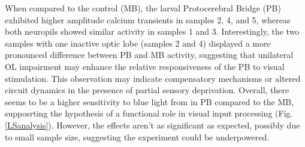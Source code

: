 When compared to the control (MB), the larval Protocerebral Bridge (PB) exhibited higher amplitude calcium transients in samples 2, 4, and 5, whereas both neuropils showed similar activity in samples 1 and 3. Interestingly, the two samples with one inactive optic lobe (samples 2 and 4) displayed a more pronounced difference between PB and MB activity, suggesting that unilateral OL impairment may enhance the relative responsiveness of the PB to visual stimulation. This observation may indicate compensatory mechanisms or altered circuit dynamics in the presence of partial sensory deprivation. 
Overall, there seems to be a higher sensitivity to blue light from in PB compared to the MB, supposrting the hypothesis of a functional role in visual input processing (Fig. \ref{LSanalysis}). However, the effects aren't as significant as expected, possibly due to small sample size, suggesting the experiment could be underpowered.



